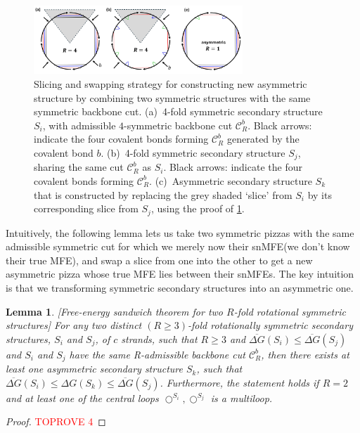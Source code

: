 \documentclass[11pt,letterpaper]{article}  \usepackage[margin=1in]{geometry}
\newtheorem{lemma}[theorem]{Lemma}
\theoremstyle{definition}  \newtheorem{Definition}[theorem]{Definition}
\newcommand{\snMFE}{snMFE\xspace}
\newcommand{\DGnosym}{\ensuremath{\overline{\Delta G}}}
\begin{document}
\begin{figure}[t]
	\centering\includegraphics[width=0.7\textwidth]{figures/sand.jpg}
	\caption{Slicing and swapping strategy for constructing new asymmetric structure by combining two symmetric structures with the same symmetric backbone cut. 
		(a)~4-fold symmetric secondary structure $S_i$, with admissible $4$-symmetric backbone cut $\mathcal{C}_R^b$.
		Black arrows: indicate the four covalent bonds forming $\mathcal{C}_R^b$ generated by the covalent bond $b$. 
		(b)~4-fold symmetric secondary structure $S_j$, sharing the same cut $\mathcal{C}_R^b$ as $S_i$.
		Black arrows: indicate the four covalent bonds forming $\mathcal{C}_R^b$. 
		(c)~Asymmetric secondary structure $S_k$ that is constructed by replacing the grey shaded `slice' from $S_i$ by its corresponding slice from $S_j$, using the proof of  \cref{lem:sand}. 
	}\label{fig:sand}
\end{figure}



Intuitively, the following lemma lets us take two symmetric pizzas with the same admissible symmetric cut for which we merely now their \snMFE (we don't know their true MFE), and swap a slice from one into the other to get a new asymmetric pizza whose true MFE lies between their {\snMFE}s. The key intuition is that we transforming symmetric secondary structures into an  asymmetric one. 

\begin{lemma}\label{lem:sand}[Free-energy sandwich theorem for two $R$-fold rotational symmetric  structures]
	For any two distinct $(R \geq 3)$-fold rotationally symmetric secondary structures, $S_i$ and $S_j$, of $c$ strands, such that $R \geq 3$ and $\DGnosym(S_i) \leq \DGnosym(S_j)$ and $S_i$ and $S_j$ have the same R-admissible backbone cut $\mathcal{C}_R^b$, then there exists at least one asymmetric secondary structure $S_k$, such that $\DGnosym(S_i) \leq \Delta G(S_k) \leq \DGnosym(S_j)$.  Furthermore, the statement holds if $R=2$ and at least one of the central loops  $\bigcirc^{S_i},  \bigcirc^{S_j}$  is a multiloop. 
\end{lemma}

\begin{proof}\textcolor{red}{TOPROVE 4}\end{proof}
\end{document}
